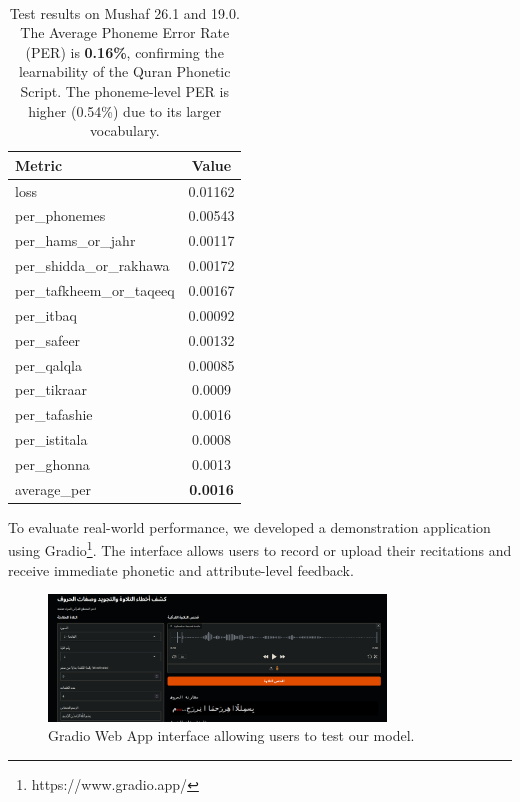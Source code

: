 \begin{table}[htbp]
\centering
\caption{Test results on Mushaf 26.1 and 19.0. The Average Phoneme Error Rate (PER) is \textbf{0.16\%}, confirming the learnability of the Quran Phonetic Script. The phoneme-level PER is higher (0.54\%) due to its larger vocabulary.}
\label{tab:results}\\
\vspace{3pt}
\label{tab:results}
\begin{tabular}{lc}
\hline
\textbf{Metric} & \textbf{Value} \\
\hline
loss & 0.01162 \\
per\_phonemes & 0.00543 \\
per\_hams\_or\_jahr & 0.00117 \\
per\_shidda\_or\_rakhawa & 0.00172 \\
per\_tafkheem\_or\_taqeeq & 0.00167 \\
per\_itbaq & 0.00092 \\
per\_safeer & 0.00132 \\
per\_qalqla & 0.00085 \\
per\_tikraar & 0.0009 \\
per\_tafashie & 0.0016 \\
per\_istitala & 0.0008 \\
per\_ghonna & 0.0013 \\
average\_per & \textbf{0.0016} \\
\hline
\end{tabular}
\end{table}


To evaluate real-world performance, we developed a demonstration application using Gradio\footnote{https://www.gradio.app/}. The interface allows users to record or upload their recitations and receive immediate phonetic and attribute-level feedback.

\begin{figure}[H]
\centering
\includegraphics[width=0.8\textwidth]{../figures/gradio_ui_main.png}
\caption{Gradio Web App interface allowing users to test our model.}
\label{fig:gradio_main}
\end{figure}

